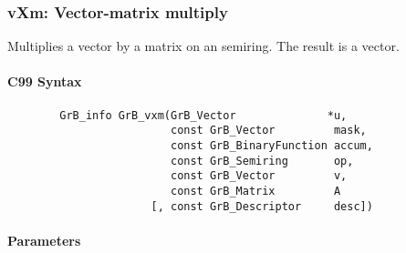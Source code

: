 

\subsubsection{{\sf vXm}: Vector-matrix multiply}

Multiplies a vector by a matrix on an semiring. The result is a vector.

\paragraph{C99 Syntax}

\begin{verbatim}
        GrB_info GrB_vxm(GrB_Vector              *u,
                         const GrB_Vector         mask,
                         const GrB_BinaryFunction accum,
                         const GrB_Semiring       op,
                         const GrB_Vector         v, 
                         const GrB_Matrix         A
                      [, const GrB_Descriptor     desc])
\end{verbatim}

\paragraph{Parameters}

